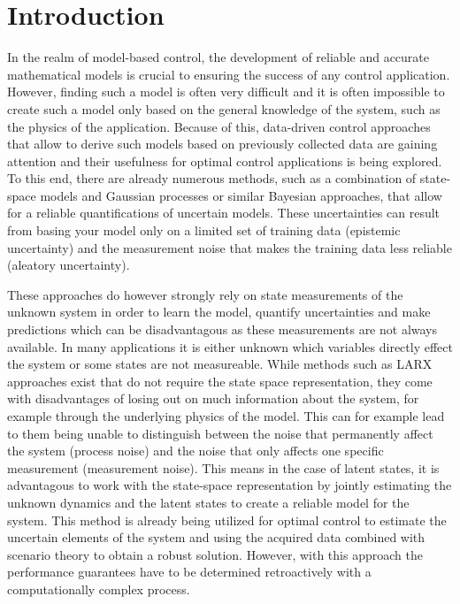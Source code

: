 \chapter{Introduction}
\label{sec:introduction}

In the realm of model-based control, the development of reliable and accurate mathematical models is crucial to ensuring the success of any control application. However, finding such a model is often very difficult and it is often impossible to create such a model only based on the general knowledge of the system, such as the physics of the application. Because of this, data-driven control approaches that allow to derive such models based on previously collected data are gaining attention and their usefulness for optimal control applications is being explored. To this end, there are already numerous methods, such as a combination of state-space models and Gaussian processes \cite{Williams_06} or similar Bayesian approaches, that allow for a reliable quantifications of uncertain models. These uncertainties can result from basing your model only on a limited set of training data (epistemic uncertainty) and the measurement noise that makes the training data less reliable (aleatory uncertainty). 

These approaches do however strongly rely on state measurements of the unknown system in order to learn the model, quantify uncertainties and make predictions which can be disadvantagous as these measurements are not always available. In many applications it is either unknown which variables directly effect the system or some states are not measureable. While methods such as LARX approaches \cite{Maiworm_21} exist that do not require the state space representation, they come with disadvantages of losing out on much information about the system, for example through the underlying physics of the model. This can for example lead to them being unable to distinguish between the noise that permanently affect the system (process noise) and the noise that only affects one specific measurement (measurement noise). This means in the case of latent states, it is advantagous to work with the state-space representation by jointly estimating the unknown dynamics and the latent states to create a reliable model for the system. This method is already being utilized for optimal control \cite{Robert_24} to estimate the uncertain elements of the system and using the acquired data combined with scenario theory \cite{Garatti_22} to obtain a robust solution. However, with this approach the performance guarantees have to be determined retroactively with a computationally complex process.
 
